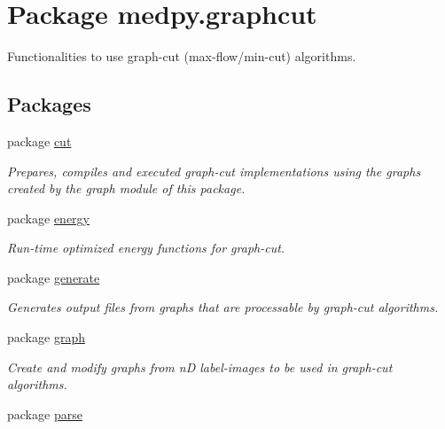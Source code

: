 \hypertarget{namespacemedpy_1_1graphcut}{
\section{Package medpy.graphcut}
\label{namespacemedpy_1_1graphcut}
}


Functionalities to use graph-\/cut (max-\/flow/min-\/cut) algorithms.  


\subsection*{Packages}
\begin{DoxyCompactItemize}
\item 
package \hyperlink{namespacemedpy_1_1graphcut_1_1cut}{cut}


\begin{DoxyCompactList}\small\item\em Prepares, compiles and executed graph-\/cut implementations using the graphs created by the graph module of this package. \end{DoxyCompactList}

\item 
package \hyperlink{namespacemedpy_1_1graphcut_1_1energy}{energy}


\begin{DoxyCompactList}\small\item\em Run-\/time optimized energy functions for graph-\/cut. \end{DoxyCompactList}

\item 
package \hyperlink{namespacemedpy_1_1graphcut_1_1generate}{generate}


\begin{DoxyCompactList}\small\item\em Generates output files from graphs that are processable by graph-\/cut algorithms. \end{DoxyCompactList}

\item 
package \hyperlink{namespacemedpy_1_1graphcut_1_1graph}{graph}


\begin{DoxyCompactList}\small\item\em Create and modify graphs from nD label-\/images to be used in graph-\/cut algorithms. \end{DoxyCompactList}

\item 
package \hyperlink{namespacemedpy_1_1graphcut_1_1parse}{parse}



\end{DoxyCompactItemize}
